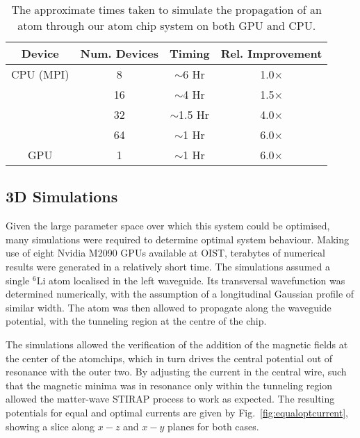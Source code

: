 \begin{table}[tb]
  \begin{center}
    \begin{tabular}{|c||c|c|c|}
      \hline
      Device & Num. Devices & Timing  & Rel. Improvement \\ \hline
      CPU (MPI) & 8 & $\sim$6 Hr & 1.0$\times$ \\
      & 16 & $\sim$4 Hr & 1.5$\times$ \\
      & 32 & $\sim$1.5 Hr & 4.0$\times$ \\
      & 64 & $\sim$1 Hr & 6.0$\times$ \\ \hline
      GPU & 1 & $\sim$1 Hr & 6.0$\times$ \\ \hline
    \end{tabular}
  \end{center}
   \caption{The approximate times taken to simulate the propagation of an atom through our atom chip system on both GPU and CPU.}
   \label{tbl:timing}
\end{table}



\subsection{3D Simulations}
\label{sec:Results}

Given the large parameter space over which this system could be optimised, many simulations were required to determine optimal system behaviour. Making use of eight Nvidia M2090 GPUs available at OIST, terabytes of numerical results were generated in a relatively short time. The simulations assumed a single $^{6}$Li atom localised in the left waveguide. Its transversal wavefunction was determined numerically, with the assumption of a longitudinal Gaussian profile of similar width. The atom was then allowed to propagate along the waveguide potential, with the tunneling region at the centre of the chip.

The simulations allowed the verification of the addition of the magnetic fields at the center of the atomchips, which in turn drives the central potential out of resonance with the outer two. By adjusting the current in the central wire, such that the magnetic minima was in resonance only within the tunneling region allowed the matter-wave STIRAP process to work as expected. The resulting potentials for equal and optimal currents are given by Fig.~\ref{fig:equaloptcurrent}, showing a slice along $x-z$ and $x-y$ planes for both cases.

